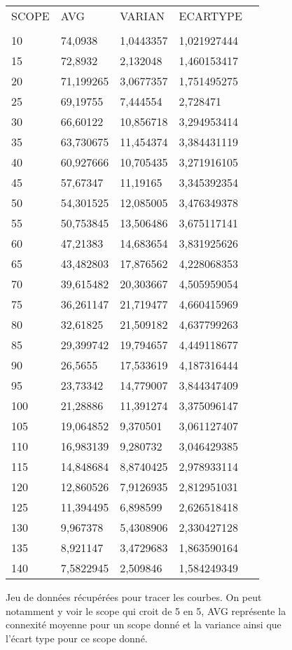 \documentclass[11pt,a4paper,sans]{report}
\begin{document}
	\begin{figure}[H]
		\centering
		\begin{tabular}{lllll}
			SCOPE   & AVG       & VARIAN    & ECARTYPE    &  \\
				&           &           &             &  \\
			10  & 74,0938   & 1,0443357 & 1,021927444 &  \\
			15  & 72,8932   & 2,132048  & 1,460153417 &  \\
			20  & 71,199265 & 3,0677357 & 1,751495275 &  \\
			25  & 69,19755  & 7,444554  & 2,728471    &  \\
			30  & 66,60122  & 10,856718 & 3,294953414 &  \\
			35  & 63,730675 & 11,454374 & 3,384431119 &  \\
			40  & 60,927666 & 10,705435 & 3,271916105 &  \\
			45  & 57,67347  & 11,19165  & 3,345392354 &  \\
			50  & 54,301525 & 12,085005 & 3,476349378 &  \\
			55  & 50,753845 & 13,506486 & 3,675117141 &  \\
			60  & 47,21383  & 14,683654 & 3,831925626 &  \\
			65  & 43,482803 & 17,876562 & 4,228068353 &  \\
			70  & 39,615482 & 20,303667 & 4,505959054 &  \\
			75  & 36,261147 & 21,719477 & 4,660415969 &  \\
			80  & 32,61825  & 21,509182 & 4,637799263 &  \\
			85  & 29,399742 & 19,794657 & 4,449118677 &  \\
			90  & 26,5655   & 17,533619 & 4,187316444 &  \\
			95  & 23,73342  & 14,779007 & 3,844347409 &  \\
			100 & 21,28886  & 11,391274 & 3,375096147 &  \\
			105 & 19,064852 & 9,370501  & 3,061127407 &  \\
			110 & 16,983139 & 9,280732  & 3,046429385 &  \\
			115 & 14,848684 & 8,8740425 & 2,978933114 &  \\
			120 & 12,860526 & 7,9126935 & 2,812951031 &  \\
			125 & 11,394495 & 6,898599  & 2,626518418 &  \\
			130 & 9,967378  & 5,4308906 & 2,330427128 &  \\
			135 & 8,921147  & 3,4729683 & 1,863590164 &  \\
			140 & 7,5822945 & 2,509846  & 1,584249349 & 
		\end{tabular}
		\caption{Jeu de données récupérées pour tracer les courbes. On peut notamment y voir le scope qui croit de 5 en 5, AVG représente la connexité moyenne pour un scope donné et la variance ainsi que l'écart type pour ce scope donné.}
	\end{figure}
\end{document}
